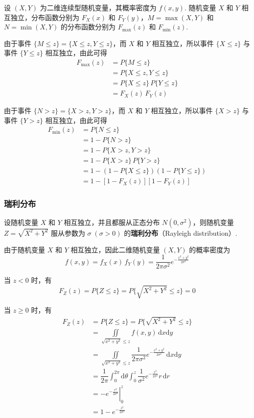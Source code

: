 设 $(X,Y)$ 为二维连续型随机变量，其概率密度为 $f(x,y)$. 随机变量 $X$ 和 $Y$ 相互独立，分布函数分别为 $F_{X}(x)$ 和 $F_{Y}(y)$，$M = \max(X,Y)$ 和 $N = \min(X,Y)$ 的分布函数分别为 $F_{\text{max}}(z)$ 和 $F_{\text{min}}(z)$.

由于事件 $\{M \leqslant z\} = \{X \leqslant z, Y \leqslant z\}$，而 $X$ 和 $Y$ 相互独立，所以事件 $\{X \leqslant z\}$ 与事件 $\{Y \leqslant z\}$ 相互独立，由此可得
$$
\begin{aligned}
    F_{\text{max}}(z) &= P\{M \leqslant z\} \\
    &= P\{X \leqslant z, Y \leqslant z\} \\
    &= P\{X \leqslant z\} \, P\{Y \leqslant z\} \\
    &= F_{X}(z) \, F_{Y}(z)
\end{aligned}
$$

由于事件 $\{N>z\} = \{X>z, Y>z\}$，而 $X$ 和 $Y$ 相互独立，所以事件 $\{X>z\}$ 与事件 $\{Y>z\}$ 相互独立，由此可得
$$
\begin{aligned}
    F_{\text{min}}(z) &= P\{N \leqslant z\} \\
    &= 1 - P\{N>z\} \\
    &= 1 - P\{X>z, Y>z\} \\
    &= 1 - P\{X>z\} \, P\{Y>z\} \\
    &= 1 - (1 - P\{X \leqslant z\})(1 - P\{Y \leqslant z\}) \\
    &= 1 - [1 - F_{X}(z)][1 - F_{Y}(z)]
\end{aligned}
$$

\subsubsection{瑞利分布}

设随机变量 $X$ 和 $Y$ 相互独立，并且都服从正态分布 $N(0, \sigma^2)$，则随机变量 $Z = \sqrt{X^2 + Y^2}$ 服从参数为 $\sigma \; (\sigma > 0)$ 的\textbf{瑞利分布}（Rayleigh distribution）.

由于随机变量 $X$ 和 $Y$ 相互独立，因此二维随机变量 $(X,Y)$ 的概率密度为
$$
f(x,y) = f_{X}(x) \, f_{Y}(y) = \dfrac{1}{2 \pi \sigma^2} e^{-\frac{x^2 + y^2}{2 \sigma^2}}
$$

当 $z<0$ 时，有
$$
F_{Z}(z) = P\{Z \leqslant z\} = P\{\sqrt{X^2 + Y^2} \leqslant z\} = 0
$$

当 $z \geqslant 0$ 时，有
$$
\begin{aligned}
    F_{Z}(z) &= P\{Z \leqslant z\} = P\{\sqrt{X^2 + Y^2} \leqslant z\} \\
    &= \underset{\sqrt{x^2 + y^2} \leqslant z}{\iint} f(x,y) \, \text{d}x \text{d}y \\
    &= \underset{\sqrt{x^2 + y^2} \leqslant z}{\iint} \dfrac{1}{2 \pi \sigma^2} e^{-\frac{x^2 + y^2}{2 \sigma^2}} \, \text{d}x \text{d}y \\
    &= \dfrac{1}{2 \pi} \int_0^{2 \pi} \text{d}\theta \int_0^z \dfrac{1}{\sigma^2} e^{-\frac{r^2}{2 \sigma^2}} r \, \text{d}r \\
    &= \left. -e^{-\frac{r^2}{2 \sigma^2}} \right|_0^z \\
    &= 1 - e^{-\frac{z^2}{2 \sigma^2}}
\end{aligned}
$$

